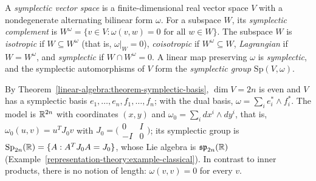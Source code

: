 \begin{definition}\label{symplectic-geometry:definition-symplectic-vector-space}
A \emph{symplectic vector space} is a finite-dimensional real vector space $V$ with a nondegenerate alternating bilinear form $\omega$. For a subspace $W$, its \emph{symplectic complement} is
$W^\omega = \{v \in V : \omega(v, w) = 0 \text{ for all } w \in W\}$. The subspace $W$ is \emph{isotropic} if $W \subseteq W^\omega$ (that is, $\omega|_W = 0$), \emph{coisotropic} if $W^\omega \subseteq W$,
\emph{Lagrangian} if $W = W^\omega$, and \emph{symplectic} if $W \cap W^\omega = 0$. A linear map preserving $\omega$ is \emph{symplectic}, and the symplectic automorphisms of $V$ form the
\emph{symplectic group} $\mathrm{Sp}(V, \omega)$.
\end{definition}

By Theorem~\ref{linear-algebra:theorem-symplectic-basis}, $\dim V = 2n$ is even and $V$ has a symplectic basis $e_1, \ldots, e_n, f_1, \ldots, f_n$; with the dual basis,
$\omega = \sum_ie_i^* \wedge f_i^*$. The model is $\mathbb{R}^{2n}$ with coordinates $(x, y)$ and $\omega_0 = \sum_idx^i \wedge dy^i$, that is, $\omega_0(u, v) = u^TJ_0v$ with
$J_0 = \bigl(\begin{smallmatrix}0 & I\\ -I & 0\end{smallmatrix}\bigr)$; its symplectic group is $\mathrm{Sp}_{2n}(\mathbb{R}) = \{A : A^TJ_0A = J_0\}$, whose Lie algebra is $\mathfrak{sp}_{2n}(\mathbb{R})$
(Example~\ref{representation-theory:example-classical}). In contrast to inner products, there is no notion of length: $\omega(v, v) = 0$ for every $v$.

